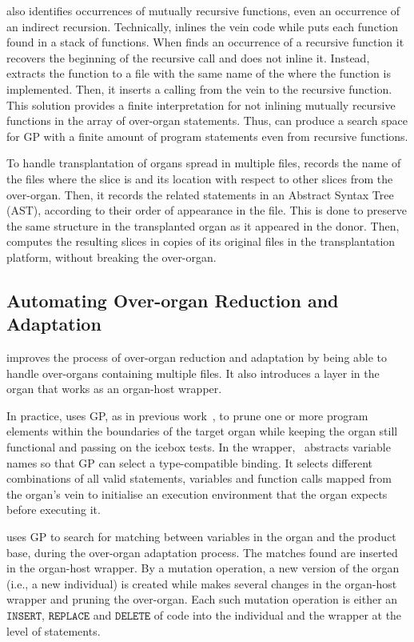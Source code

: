 \prodscalpel also identifies occurrences of mutually recursive functions, even an occurrence of an indirect recursion. Technically, \prodscalpel inlines the vein code while puts each function found in a stack of functions. When \prodscalpel finds an occurrence of a recursive function it recovers the beginning of the recursive call and does not inline it. Instead, \prodscalpel extracts the function to a file with the same name of the where the function is implemented. Then, it inserts a calling from the vein to the recursive function. This solution provides a finite interpretation for not inlining mutually recursive functions in the array of over-organ statements. Thus, \prodscalpel can produce a search space for GP with a finite amount of program statements even from recursive functions.

To handle transplantation of organs spread in multiple files, \prodscalpel records the name of the files where the slice is and its location with respect to other slices from the over-organ. 
Then, it records the related statements in an Abstract Syntax Tree (AST), according to their order of appearance in the file. 
This is done to preserve the same structure in the transplanted organ as it appeared in the donor.
Then, \prodscalpel computes the resulting slices in copies of its original files  in the transplantation platform, without breaking the over-organ.


\subsection{Automating Over-organ Reduction and Adaptation}\label{sec:organ_reduction}
\prodscalpel improves the process of over-organ reduction and adaptation by being able to handle over-organs containing multiple files.
It also introduces a layer in the organ that works as an organ-host wrapper. 

In practice, \prodscalpel uses GP, as in previous work~\cite{Barr2015}, to prune one or more program elements within the boundaries of the target organ while keeping the organ still functional and passing on the icebox tests. 
In the wrapper, \prodscalpel~abstracts variable names so that GP can select a type-compatible binding. It selects different combinations of all valid statements, variables and function calls mapped from the organ's vein to initialise an execution environment that the organ expects before executing it. 

\prodscalpel uses GP to search for matching between variables in the organ and the product base, during the over-organ adaptation process. The matches found are inserted in the organ-host wrapper. 
By a mutation operation, a new version of the organ (i.e., a new individual) is created while \prodscalpel makes several changes in the organ-host wrapper and pruning the over-organ. Each such mutation operation is either an $\texttt{INSERT}$, $\texttt{REPLACE}$ and $\texttt{DELETE}$ of code into the individual and the wrapper at the level of statements.

